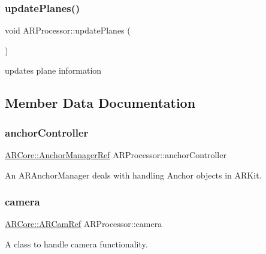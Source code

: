 \subsubsection{\texorpdfstring{update\+Planes()}{updatePlanes()}}
{\footnotesize\ttfamily void A\+R\+Processor\+::update\+Planes (\begin{DoxyParamCaption}{ }\end{DoxyParamCaption})}



updates plane information 



\subsection{Member Data Documentation}
\mbox{\label{class_a_r_processor_a8a1a8f16b30d2b0b4839a30d7ba4763d}} 
\subsubsection{\texorpdfstring{anchor\+Controller}{anchorController}}
{\footnotesize\ttfamily \hyperlink{namespace_a_r_core_a3f2b9ba00b51ce19c1010f554a66a512}{A\+R\+Core\+::\+Anchor\+Manager\+Ref} A\+R\+Processor\+::anchor\+Controller}



An A\+R\+Anchor\+Manager deals with handling Anchor objects in A\+R\+Kit. 

\mbox{\label{class_a_r_processor_a0df4995c56cb187db281726d7631d9ed}} 
\subsubsection{\texorpdfstring{camera}{camera}}
{\footnotesize\ttfamily \hyperlink{namespace_a_r_core_a4ebe9e23907235fcf76bf65440fde0e0}{A\+R\+Core\+::\+A\+R\+Cam\+Ref} A\+R\+Processor\+::camera}



A class to handle camera functionality. 

\mbox{\label{class_a_r_processor_a6b7b4d5ac724bd93a7828759f7f6da4e}} 
